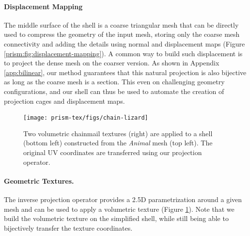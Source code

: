 \paragraph{Displacement Mapping}
The middle surface of the shell is a coarse triangular mesh that can be directly used to compress the geometry of the input mesh, storing only the coarse mesh connectivity and adding the details using normal and displacement maps (Figure \ref{prism:fig:displacement-mapping}). A common way to build such displacement is to project  the dense mesh on the coarser version. As shown in Appendix \ref{app:bilinear}, our method guarantees that this natural projection is also bijective as long as the coarse mesh is a section. This 
even on challenging geometry configurations, and our shell can thus be used to automate the creation of projection cages and displacement maps.



\begin{figure}
    \centering
    \texttt{[image: prism-tex/figs/chain-lizard]}
    \caption{Two volumetric chainmail textures (right) are applied to a shell (bottom left) constructed from the \emph{Animal} mesh (top left).
    The original UV coordinates are transferred using our projection operator.}
    \label{prism:fig:volumetric-textures}
    
\end{figure}
\paragraph{Geometric Textures.}
The inverse projection operator provides a 2.5D parametrization around a given mesh and can be used to apply a volumetric texture (Figure \ref{prism:fig:volumetric-textures}).
Note that we build the volumetric texture on the simplified shell, while still being able to bijectively transfer the texture coordinates.



